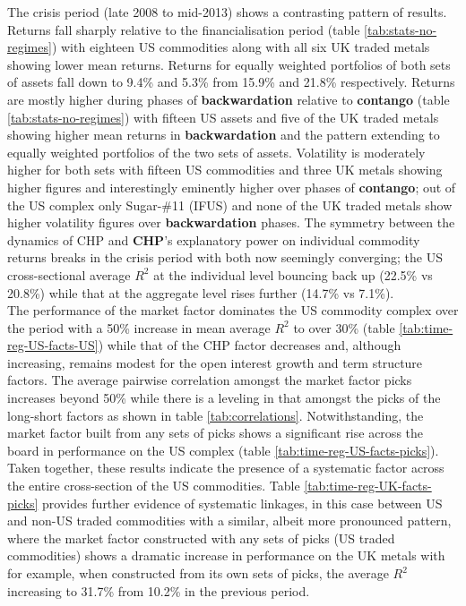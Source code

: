 \documentclass[]{elsarticle} %
\begin{document}
The crisis period (late 2008 to mid-2013) shows a contrasting pattern of results. Returns fall sharply relative to the financialisation period (table \ref{tab:stats-no-regimes}) with eighteen US commodities along with all six UK traded metals showing lower mean returns. Returns for equally weighted portfolios of both sets of assets fall down to 9.4\% and 5.3\% from 15.9\% and 21.8\% respectively. Returns are mostly higher during phases of \textbf{backwardation} relative to \textbf{contango} (table \ref{tab:stats-no-regimes}) with fifteen US assets and five of the UK traded metals showing higher mean returns in \textbf{backwardation} and the pattern extending to equally weighted portfolios of the two sets of assets. Volatility is moderately higher for both sets with fifteen US commodities and three UK metals showing higher figures and interestingly eminently higher over phases of \textbf{contango}; out of the US complex only Sugar-\#11 (IFUS) and none of the UK traded metals show higher volatility figures over \textbf{backwardation} phases. The symmetry between the dynamics of CHP and \textbf{CHP}'s explanatory power on individual commodity returns breaks in the crisis period with both now seemingly converging; the US cross-sectional average \(R^{2}\) at the individual level bouncing back up (22.5\% vs 20.8\%) while that at the aggregate level rises further (14.7\% vs 7.1\%).\\
The performance of the market factor dominates the US commodity complex over the period with a 50\% increase in mean average \(R^{2}\) to over 30\% (table \ref{tab:time-reg-US-facts-US}) while that of the CHP factor decreases and, although increasing, remains modest for the open interest growth and term structure factors. The average pairwise correlation amongst the market factor picks increases beyond 50\% while there is a leveling in that amongst the picks of the long-short factors as shown in table \ref{tab:correlations}. Notwithstanding, the market factor built from any sets of picks shows a significant rise across the board in performance on the US complex (table \ref{tab:time-reg-US-facts-picks}).\\
Taken together, these results indicate the presence of a systematic factor across the entire cross-section of the US commodities. Table \ref{tab:time-reg-UK-facts-picks} provides further evidence of systematic linkages, in this case between US and non-US traded commodities with a similar, albeit more pronounced pattern, where the market factor constructed with any sets of picks (US traded commodities) shows a dramatic increase in performance on the UK metals with for example, when constructed from its own sets of picks, the average \(R^{2}\) increasing to 31.7\% from 10.2\% in the previous period.
\end{document}
